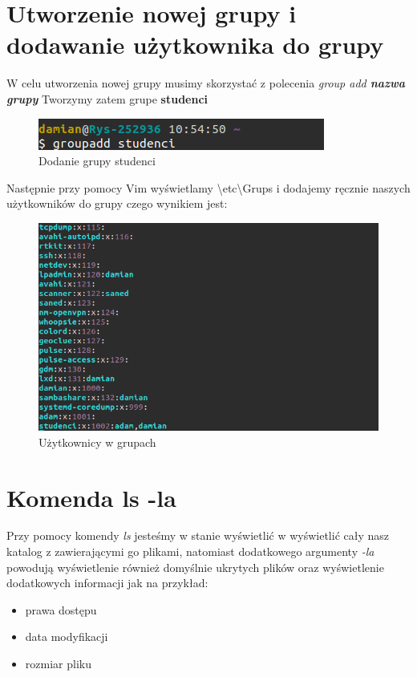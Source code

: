 \documentclass{article}
\begin{document}
\section{Utworzenie nowej grupy i dodawanie użytkownika do grupy}
W celu utworzenia nowej grupy musimy skorzystać z polecenia \textit{group add \textbf{nazwa grupy}}
Tworzymy zatem grupe \textbf{studenci}
\begin{figure}[H]
    \centering
   \includegraphics[totalheight=1cm]{data/addStudenci.png}
    \caption{Dodanie grupy studenci}
    \label{2}
\end{figure}
Następnie przy pomocy Vim wyświetlamy \textbackslash etc\textbackslash Grups i 
dodajemy ręcznie naszych użytkowników do grupy czego wynikiem jest:

\begin{figure}[H]
    \centering
   \includegraphics[totalheight=8cm]{data/gruupsWith.png}
    \caption{Użytkownicy w grupach}
    \label{2}
\end{figure}


\section{Komenda ls -la}
Przy pomocy komendy \textit{ls} jesteśmy w stanie wyświetlić w wyświetlić
cały nasz katalog z zawierającymi go plikami, natomiast dodatkowego
argumenty \textit{-la} powodują wyświetlenie również domyślnie ukrytych
plików oraz wyświetlenie dodatkowych informacji jak na przykład: 
\begin{itemize}
    \item prawa dostępu
    \item data modyfikacji
    \item rozmiar pliku
\end{itemize}
\end{document}
